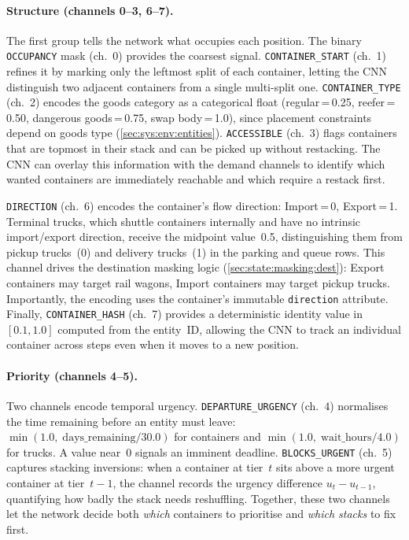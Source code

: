 \paragraph{Structure (channels 0--3, 6--7).}
\label{sec:state:channels:structure}
The first group tells the network what occupies each position. The binary \texttt{OCCUPANCY} mask (ch.~0) provides the coarsest signal. \texttt{CONTAINER\_START} (ch.~1) refines it by marking only the leftmost split of each container, letting the CNN distinguish two adjacent containers from a single multi-split one. \texttt{CONTAINER\_TYPE} (ch.~2) encodes the goods category as a categorical float (regular\,=\,0.25, reefer\,=\,0.50, dangerous goods\,=\,0.75, swap body\,=\,1.0), since placement constraints depend on goods type (\cref{sec:sys:env:entities}). \texttt{ACCESSIBLE} (ch.~3) flags containers that are topmost in their stack and can be picked up without restacking. The CNN can overlay this information with the demand channels to identify which wanted containers are immediately reachable and which require a restack first.

\texttt{DIRECTION} (ch.~6) encodes the container's flow direction: Import\,=\,0, Export\,=\,1. Terminal trucks, which shuttle containers internally and have no intrinsic import/export direction, receive the midpoint value~0.5, distinguishing them from pickup trucks~(0) and delivery trucks~(1) in the parking and queue rows. This channel drives the destination masking logic (\cref{sec:state:masking:dest}): Export containers may target rail wagons, Import containers may target pickup trucks. Importantly, the encoding uses the container's immutable \texttt{direction} attribute. Finally, \texttt{CONTAINER\_HASH} (ch.~7) provides a deterministic identity value in~$[0.1, 1.0]$ computed from the entity~ID, allowing the CNN to track an individual container across steps even when it moves to a new position.

\paragraph{Priority (channels 4--5).}
\label{sec:state:channels:priority}
Two channels encode temporal urgency. \texttt{DEPARTURE\_URGENCY} (ch.~4) normalises the time remaining before an entity must leave: \newline $\min(1.0,\; \text{days\_remaining} / 30.0)$ for containers and $\min(1.0,\; \text{wait\_hours} / 4.0)$ for trucks. A value near~0 signals an imminent deadline. \texttt{BLOCKS\_URGENT} (ch.~5) captures stacking inversions: when a container at tier~$t$ sits above a more urgent container at tier~$t{-}1$, the channel records the urgency difference $u_t - u_{t{-}1}$, quantifying how badly the stack needs reshuffling. Together, these two channels let the network decide both \emph{which} containers to prioritise and \emph{which stacks} to fix first.


